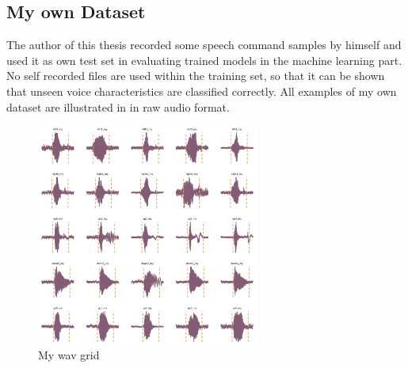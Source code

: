 
\subsection{My own Dataset}
The author of this thesis recorded some speech command samples by himself and used it as own test set in evaluating trained models in the machine learning part. No self recorded files are used within the training set, so that it can be shown that unseen voice characteristics are classified correctly.
All examples of my own dataset are illustrated in  in raw audio format.

\begin{figure}[!ht]
  \centering
    \includegraphics[width=0.65\textwidth]{./4_practice/figs/dataset_wav_grid_my}
  \caption{My wav grid}
  \label{fig:dataset_wav_grid_my}
\end{figure}
\FloatBarrier
\noindent